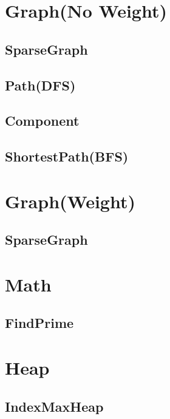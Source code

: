 \section{Graph(No Weight)}
    \subsection{SparseGraph}
        
    \subsection{Path(DFS)}
        
    \subsection{Component}
        
    \subsection{ShortestPath(BFS)}
        

\section{Graph(Weight)}
    \subsection{SparseGraph}
        
        
        
\section{Math}
    \subsection{FindPrime}
        

\section{Heap}
    \subsection{IndexMaxHeap}
        